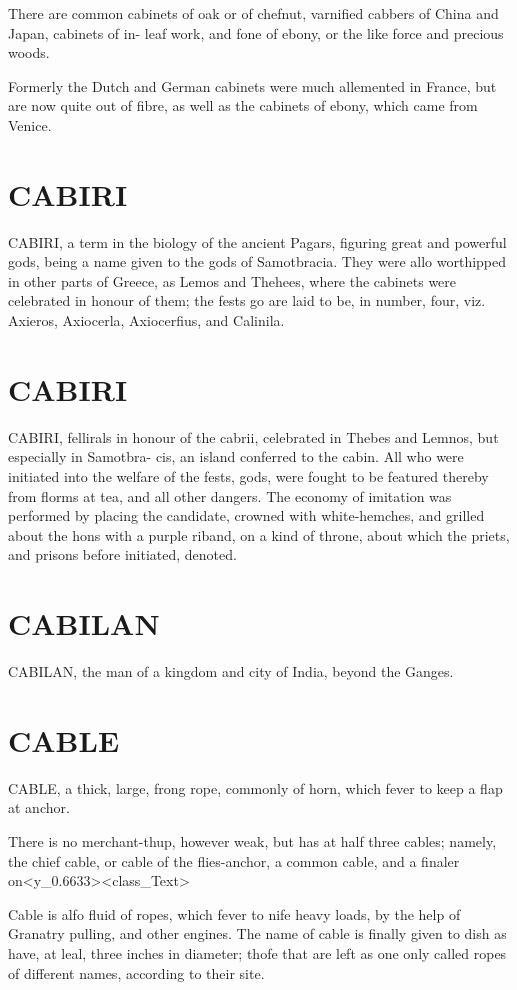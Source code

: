 \documentclass{article}
\begin{document}
There are common cabinets of oak or of chefnut, varnified cabbers of China and Japan, cabinets of in- leaf work, and fone of ebony, or the like force and precious woods.

Formerly the Dutch and German cabinets were much allemented in France, but are now quite out of fibre, as well as the cabinets of ebony, which came from Venice.

\section*{CABIRI}
CABIRI, a term in the biology of the ancient Pagars, figuring great and powerful gods, being a name given to the gods of Samotbracia. They were allo worthipped in other parts of Greece, as Lemos and Thehees, where the cabinets were celebrated in honour of them; the fests go are laid to be, in number, four, viz. Axieros, Axiocerla, Axiocerfius, and Calinila.

\section*{CABIRI}
CABIRI, fellirals in honour of the cabrii, celebrated in Thebes and Lemnos, but especially in Samotbra- cis, an island conferred to the cabin. All who were initiated into the welfare of the fests, gods, were fought to be featured thereby from florms at tea, and all other dangers. The economy of imitation was performed by placing the candidate, crowned with white-hemches, and grilled about the hons with a purple riband, on a kind of throne, about which the priets, and prisons before initiated, denoted.

\section*{CABILAN}
CABILAN, the man of a kingdom and city of India, beyond the Ganges.

\section*{CABLE}
CABLE, a thick, large, frong rope, commonly of horn, which fever to keep a flap at anchor.

There is no merchant-thup, however weak, but has at half three cables; namely, the chief cable, or cable of the flies-anchor, a common cable, and a finaler on<y\_0.6633><class\_Text>

Cable is alfo fluid of ropes, which fever to nife heavy loads, by the help of Granatry pulling, and other engines. The name of cable is finally given to dish as have, at leal, three inches in diameter; thofe that are left as one only called ropes of different names, according to their site.
\end{document}

